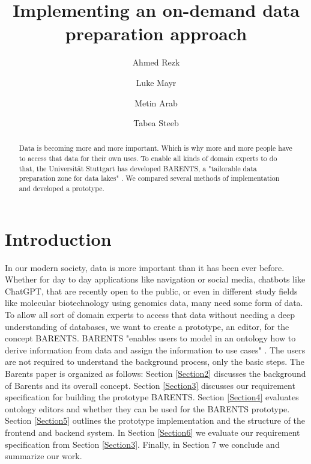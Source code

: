 \documentclass[sigconf, nonacm]{acmart}
\begin{document}
\title{Implementing an on-demand data preparation approach}


\author{Ahmed Rezk}
    
\author{Luke Mayr}

\author{Metin Arab}

\author{Tabea Steeb}

\begin{abstract}
    Data is becoming more and more important. Which is why more and more people have to access that data for their own uses. To enable all kinds of domain experts to do that, the Universität Stuttgart has developed BARENTS, a "tailorable data preparation zone for data lakes" \cite{barents21}. We compared several methods of implementation and developed a prototype.
\end{abstract}


\maketitle

\section{Introduction}
In our modern society, data is more important than it has been ever before. Whether for day to day applications like navigation or social media, chatbots like ChatGPT, that are recently open to the public, or even in different study fields like molecular biotechnology using genomics data, many need some form of data. \newline
To allow all sort of domain experts to access that data without needing a deep understanding of databases, we want to create a prototype, an editor, for the concept BARENTS. BARENTS "enables users to model in an ontology how to derive information from data and assign the information to use cases" \cite{barents21}. The users are not required to understand the background process, only the basic steps. \newline
The Barents paper is organized as follows: Section \ref{Section2} discusses the background of Barents and its overall concept. Section \ref{Section3} discusses our requirement specification for building the prototype BARENTS. Section \ref{Section4} evaluates ontology editors and whether they can be used for the BARENTS prototype. Section \ref{Section5} outlines the prototype implementation and the structure of the frontend and backend system. In Section \ref{Section6} we evaluate our requirement specification from Section \ref{Section3}. Finally, in Section 7 we conclude and summarize our work.
\end{document}
